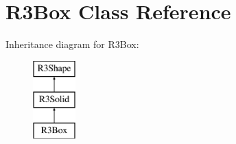 \hypertarget{class_r3_box}{}\section{R3\+Box Class Reference}
\label{class_r3_box}
Inheritance diagram for R3\+Box\+:\begin{figure}[H]
\begin{center}
\leavevmode
\includegraphics[height=3.000000cm]{class_r3_box}
\end{center}
\end{figure}

